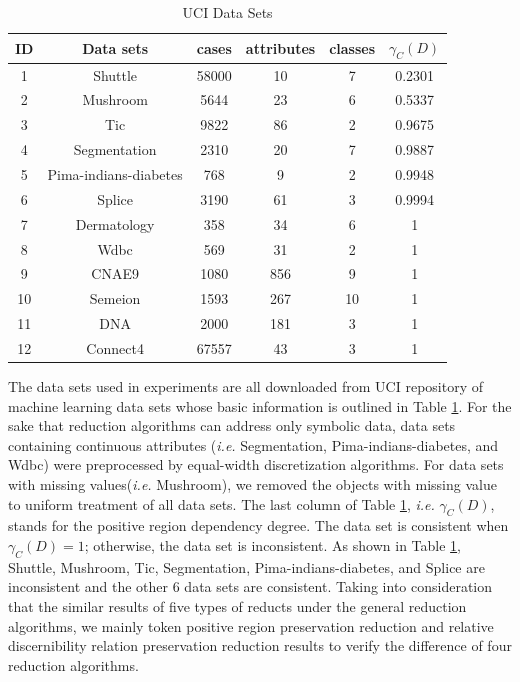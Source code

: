 \documentclass[review]{elsarticle}
\begin{document}
	\begin{table}[htbp]
		\caption{UCI Data Sets}
		\label{uci}
		\begin{center}
			\begin{tabular}{cccccc}
				\hline
				ID & Data sets                  & cases& attributes & classes & $\gamma_C(D)$ \\ \hline
				1  & Shuttle           		    & 58000 & 10         & 7       & 0.2301        \\
				2  & Mushroom                   & 5644  & 23         & 6       & 0.5337        \\
				3  & Tic	                    & 9822  & 86         & 2       & 0.9675        \\
				4  & Segmentation	     	    & 2310  & 20         & 7       & 0.9887        \\
				5  & Pima-indians-diabetes		& 768   & 9          & 2       & 0.9948        \\
				6  & Splice                     & 3190  & 61         & 3       & 0.9994        \\
				7  & Dermatology                & 358   & 34         & 6       & 1             \\
				8  & Wdbc                  		& 569   & 31         & 2       & 1             \\
				9  & CNAE9                      & 1080  & 856        & 9       & 1             \\
				10 & Semeion                    & 1593  & 267        & 10      & 1             \\
				11 & DNA                        & 2000  & 181        & 3       & 1             \\
				12 & Connect4                   & 67557 & 43         & 3       & 1             \\
				\hline
			\end{tabular}
		\end{center}
	\end{table}
	\par The data sets used in experiments are all downloaded from UCI repository of machine learning data sets \cite{Asuncion+Newman:2007} whose basic information is outlined in Table \ref{uci}. For the sake that reduction algorithms can address only symbolic data, data sets containing continuous attributes (\emph{i.e.} Segmentation, Pima-indians-diabetes, and Wdbc) were preprocessed by equal-width discretization algorithms. For data sets with missing values(\emph{i.e.} Mushroom),  we removed the objects with missing value to uniform treatment of all data sets. The last column of Table \ref{uci}, \emph{i.e.} $\gamma_C(D)$, stands for the positive region dependency degree. The data set is consistent when $\gamma_C(D)=1$; otherwise, the data set is inconsistent. As shown in Table \ref{uci}, Shuttle, Mushroom, Tic, Segmentation, Pima-indians-diabetes, and Splice are inconsistent and the other 6 data sets are consistent. Taking into consideration that the similar results of five types of reducts under the general reduction algorithms, we mainly token positive region preservation reduction and relative discernibility relation preservation reduction results to verify the difference of four reduction algorithms.
	
\end{document}

